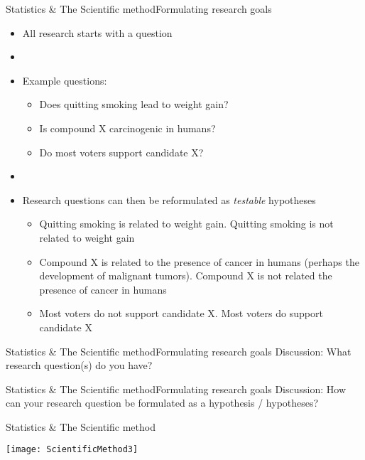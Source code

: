 \documentclass[xcolor=dvipsnames]{beamer}
\begin{document}
\begin{frame}{Statistics \& The Scientific method}{Formulating research goals}
\begin{itemize}
	\item All research starts with a question \pause
	\item[]
	\item Example questions: 
	\begin{itemize}
		\item Does quitting smoking lead to weight gain?\pause
		\item Is compound X carcinogenic in humans? \pause
		\item Do most voters support candidate X? \pause
	\end{itemize}
	\item[]
	\item Research questions can then be reformulated as \emph{testable} hypotheses \pause
	\begin{itemize}
		\item Quitting smoking is related to weight gain. Quitting smoking is not related to weight gain \pause
		\item Compound X is related to the presence of cancer in humans (perhaps the development of malignant tumors). Compound X is not related the presence of cancer in humans \pause
		\item Most voters do not support candidate X. Most voters do support candidate X
	\end{itemize}
\end{itemize}
\end{frame}

\begin{frame}{Statistics \& The Scientific method}{Formulating research goals}
	\vspace{-12pt}
	{\Huge Discussion: What research question(s) do you have?}
\end{frame}

\begin{frame}{Statistics \& The Scientific method}{Formulating research goals}
	\vspace{-12pt}
	{\Huge Discussion: How can your research question be formulated as a hypothesis / hypotheses?}
\end{frame}

\begin{frame}{Statistics \& The Scientific method}
\vspace{-12pt}
\begin{center}
	\texttt{[image: ScientificMethod3]}
\end{center}
\end{frame}
\end{document}
